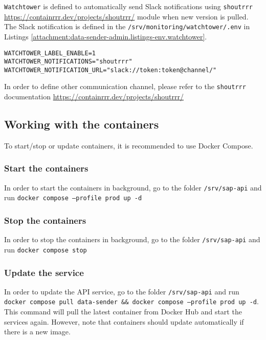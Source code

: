 \texttt{Watchtower} is defined to automatically send Slack notifications using \texttt{shoutrrr} \url{https://containrrr.dev/projects/shoutrrr/} module when new version is pulled. The Slack notification is defined in the \texttt{/srv/monitoring/watchtower/.env} in Listings \ref{attachment:data-sender-admin.listings-env.watchtower}.
\begin{lstlisting}[caption={Watchtower environment variables}]
WATCHTOWER_LABEL_ENABLE=1
WATCHTOWER_NOTIFICATIONS="shoutrrr"
WATCHTOWER_NOTIFICATION_URL="slack://token:token@channel/"
\end{lstlisting}
\label{attachment:data-sender-admin.listings-env.watchtower}
In order to define other communication channel, please refer to the \texttt{shoutrrr} documentation \url{https://containrrr.dev/projects/shoutrrr/}

\subsection{Working with the containers}
To start/stop or update containers, it is recommended to use Docker Compose.
\subsubsection{Start the containers}
In order to start the containers in background, go to the folder \texttt{/srv/sap-api} and run \texttt{docker compose --profile prod up -d}

\subsubsection{Stop the containers}
In order to stop the containers in background, go to the folder \texttt{/srv/sap-api} and run \texttt{docker compose stop}

\subsubsection{Update the service}
In order to update the API service, go to the folder \texttt{/srv/sap-api} and run \texttt{docker compose pull data-sender \&\& docker compose --profile prod up -d}.
This command will pull the latest container from Docker Hub and start the services again.
However, note that containers should update automatically if there is a new image.


